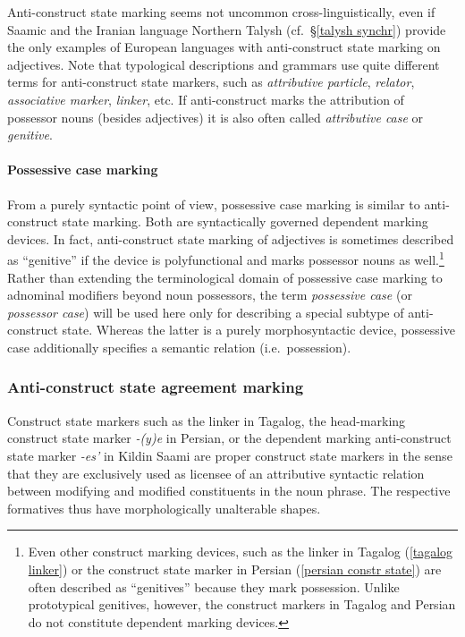 Anti-construct state marking seems not uncommon cross-linguistically, even if Saamic and the Iranian language Northern Talysh (cf.~\S\ref{talysh synchr}) provide the only examples of European languages with anti-construct state marking on adjectives. Note that typological descriptions and grammars use quite different terms for anti-construct state markers, such as \emph{attributive particle}, \emph{relator}, \emph{associative marker}, \emph{linker}, etc. If anti-construct marks the attribution of possessor nouns (besides adjectives) it is also often called \emph{attributive case} or \emph{genitive}.

\paragraph{Possessive case marking} 
From a purely syntactic point of view, possessive case marking is similar to anti-construct state marking. Both are syntactically governed dependent marking devices. In fact, anti-construct state marking of adjectives is sometimes described as “genitive” if the device is polyfunctional and marks possessor nouns as well.\footnote{Even other construct marking devices, such as the linker in Tagalog (\ref{tagalog linker}) or the construct state marker in Persian (\ref{persian constr state}) are often described as “genitives” because they mark possession. Unlike prototypical genitives, however, the construct markers in Tagalog and Persian do not constitute dependent marking devices.} Rather than extending the terminological domain of possessive case marking to adnominal modifiers beyond noun possessors, the term \emph{possessive case} (or \emph{possessor case}) will be used here only for describing a special subtype of anti-construct state. Whereas the latter is a purely morphosyntactic device, possessive case additionally specifies a semantic relation (i.e.~possession).

\subsubsection{Anti-construct state agreement marking} \label{anti-constr agr}
Construct state markers such as the linker in Tagalog, the head-marking construct state marker \textit{-(y)e} in Persian, or the dependent marking anti-construct state marker \textit{-es'} in Kildin Saami are proper construct state markers in the sense that they are exclusively used as licensee of an attributive syntactic relation between modifying and modified constituents in the noun phrase. The respective formatives thus have morphologically unalterable shapes.


